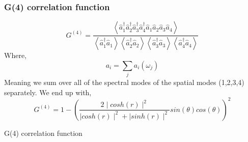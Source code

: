 \documentclass{beamer}
\renewcommand{\annia}{\hat{a}}
\renewcommand{\creata}{\hat{a}^\dagger}
\begin{document}
\begin{frame}
    \frametitle{G(4) correlation function}
    \begin{equation}
        G^{(4)} = \frac{ \left< \creata_1 \creata_2 \creata_3 \creata_4 \annia_1 \annia_2 \annia_3 \annia_4 \right>}
        {\left< \creata_1 \annia_1 \right> \left< \creata_2 \annia_2 \right> \left< \creata_3 \annia_3 \right> \left< \creata_4 \annia_4 \right>}
    \end{equation}
    Where,
    \begin{equation}
        a_i = \sum_j a_{i}(\omega_j)
    \end{equation}
    Meaning we sum over all of the spectral modes of the spatial modes (1,2,3,4) separately.
    We end up with, 
    \begin{equation}
        G^{(4)} = 1 - \left( \frac{2 \mid cosh(r) \mid^2}{\mid cosh(r) \mid ^2 + \mid sinh(r) \mid^2} sin(\theta) cos(\theta) \right)^2
    \end{equation}
\end{frame}

\begin{frame}{G(4) correlation function}

    \begin{figure}[h]
    \end{figure}
\end{frame}
\end{document}
